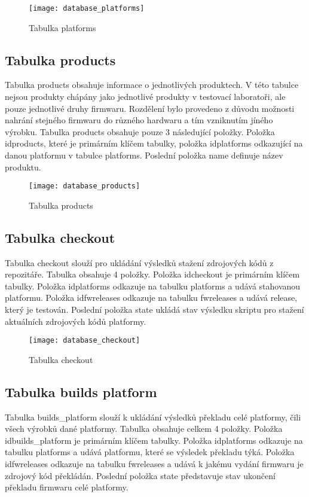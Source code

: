\begin{figure}[h]
  \centering
  \texttt{[image: database\_platforms]}
  \caption{Tabulka platforms}
  \label{fig:database_platforms}
\end{figure}

\subsection{Tabulka products}
Tabulka products obsahuje informace o jednotlivých produktech. V této tabulce nejsou produkty chápány jako jednotlivé produkty v testovací laboratoři, ale pouze jednotlivé druhy firmwaru. Rozdělení bylo provedeno z důvodu možnosti nahrání stejného firmwaru do různého hardwaru a tím vzniknutím jíného výrobku. Tabulka products obsahuje pouze 3 následující položky. Položka idproducts, které je primárním klíčem tabulky, položka idplatforms odkazující na danou platformu v tabulce platforms. Poslední položka name definuje název produktu.

\begin{figure}[h]
  \centering
  \texttt{[image: database\_products]}
  \caption{Tabulka products}
  \label{fig:database_products}
\end{figure}

\subsection{Tabulka checkout}
Tabulka checkout slouží pro ukládání výsledků stažení zdrojových kódů z repozitáře. Tabulka obsahuje 4 položky. Položka idcheckout je primárním klíčem tabulky. Položka idplatforms odkazuje na tabulku platforms a udává stahovanou platformu. Položka idfwreleases odkazuje na tabulku fwreleases a udává release, který je testován. Poslední položka state ukládá stav výsledku skriptu pro stažení aktuálních zdrojových kódů platformy.

\begin{figure}[h]
  \centering
  \texttt{[image: database\_checkout]}
  \caption{Tabulka checkout}
  \label{fig:database_checkout}
\end{figure}

\subsection{Tabulka builds platform}
Tabulka builds\_platform slouží k ukládání výsledků překladu celé platformy, čili všech výrobků dané platformy. Tabulka obsahuje celkem 4 položky. Položka idbuilds\_platform je primárním klíčem tabulky. Položka idplatforms odkazuje na tabulku platforms a udává platformu, které se výsledek překladu týká. Položka idfwreleases odkazuje na tabulku fwreleases a udává k jakému vydání firmwaru je zdrojový kód překládán. Poslední položka state představuje stav ukončení překladu firmwaru celé platformy.

